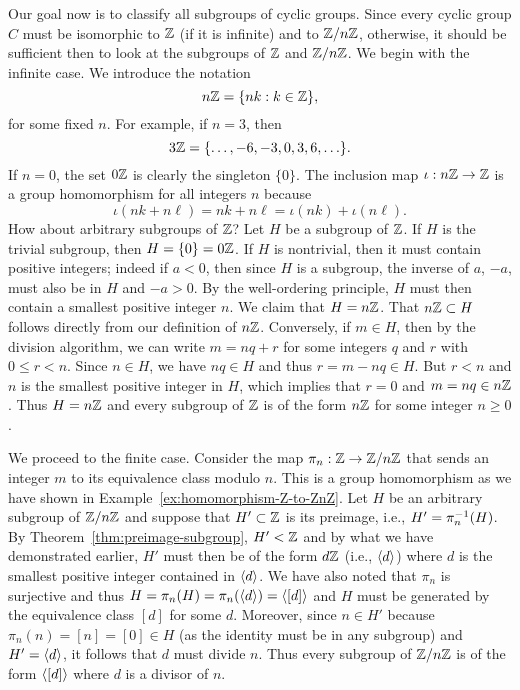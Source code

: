 \begin{example}
    Our goal now is to classify all subgroups of cyclic groups. Since every
    cyclic group \(C\) must be isomorphic to \(\mathbb{Z}\) (if it is infinite) and to
    \(\mathbb{Z}/n\mathbb{Z}\), otherwise, it should be sufficient then to look at the subgroups
    of \(\mathbb{Z}\) and \(\mathbb{Z}/n\mathbb{Z}\). We begin with the infinite case. We introduce the
    notation
    \[
        n\mathbb{Z} = \{nk : k \in \mathbb{Z}\},
    \]
    for some fixed \(n\). For example, if \(n = 3\), then
    \[
        3\mathbb{Z} = \{\ldots, -6, -3, 0, 3, 6, \ldots\}.
    \]
    If \(n = 0\), the set \(0\mathbb{Z}\) is clearly the singleton \(\{0\}\). The
    inclusion map \(\iota: n\mathbb{Z} \to \mathbb{Z}\) is a group homomorphism for all integers
    \(n\) because
    \[
        \iota(nk + n\ell) = nk + n\ell = \iota(nk) + \iota(n\ell).
    \]
    How about arbitrary subgroups of \(\mathbb{Z}\)? Let \(H\) be a subgroup of \(\mathbb{Z}\).
    If \(H\) is the trivial subgroup, then \(H = \{0\} = 0\mathbb{Z}\). If \(H\) is
    nontrivial, then it must contain positive integers; indeed if \(a < 0\),
    then since \(H\) is a subgroup, the inverse of \(a\), \(-a\), must also be
    in \(H\) and \(-a > 0\). By the well-ordering principle, \(H\) must then
    contain a smallest positive integer \(n\). We claim that \(H = n\mathbb{Z}\). That
    \(n\mathbb{Z} \subset H\) follows directly from our definition of \(n\mathbb{Z}\).
    Conversely, if \(m \in H\), then by the division algorithm, we can write \(m
    = nq + r\) for some integers \(q\) and \(r\) with \(0 \leq r < n\). Since
    \(n \in H\), we have \(nq \in H\) and thus \(r = m - nq \in H\). But \(r <
    n\) and \(n\) is the smallest positive integer in \(H\), which implies that
    \(r = 0\) and \(m = nq \in n\mathbb{Z}\). Thus \(H = n\mathbb{Z}\) and every subgroup of
    \(\mathbb{Z}\) is of the form \(n\mathbb{Z}\) for some integer \(n \geq 0\).

    We proceed to the finite case. Consider the map \(\pi_n : \mathbb{Z} \to \mathbb{Z}/n\mathbb{Z}\)
    that sends an integer \(m\) to its equivalence class modulo \(n\). This is a
    group homomorphism as we have shown in
    Example~\ref{ex:homomorphism-Z-to-ZnZ}. Let \(H\) be an arbitrary subgroup
    of \(\mathbb{Z}/n\mathbb{Z}\) and suppose that \(H' \subset \mathbb{Z}\) is its preimage, i.e., \(H'
    = \pi_n^{-1}(H)\). By Theorem~\ref{thm:preimage-subgroup}, \(H' <
    \mathbb{Z}\) and by what we have demonstrated earlier, \(H'\) must then be of the
    form \(d\mathbb{Z}\) (i.e., \(\langle d \rangle\)) where \(d\) is the smallest positive
    integer contained in \(\langle d \rangle\). We have also noted that \(\pi_n\) is
    surjective and thus \(H = \pi_n(H) = \pi_n(\langle d \rangle) = \langle [d] \rangle\) and \(H\)
    must be generated by the equivalence class \([d]\) for some \(d\). Moreover,
    since \(n \in H'\) because \(\pi_n(n) = [n] = [0] \in H\) (as the identity
    must be in any subgroup) and \(H' = \langle d \rangle\), it follows that \(d\) must
    divide \(n\). Thus every subgroup of \(\mathbb{Z}/n\mathbb{Z}\) is of the form \(\langle [d] \rangle\)
    where \(d\) is a divisor of \(n\).


\end{example}
